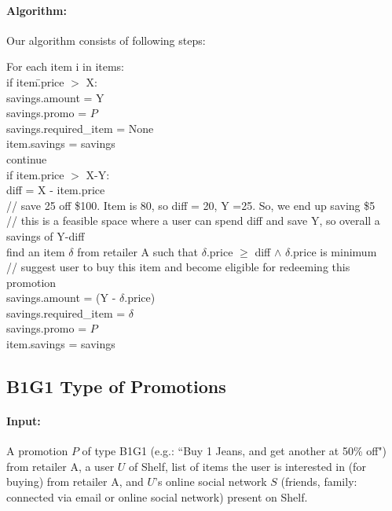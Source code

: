 \documentclass[11pt]{article}
\begin{document}
\paragraph{Algorithm:} Our algorithm consists of following steps:\\
\begin{tabbing}
For each item i in items:\\
if item\=.price $>$ X:\\
\> savings.amount = Y\\
\> savings.promo = $P$\\
\> savings.required\_item = None\\
\> item.savings = savings\\
\> continue\\
if item.price $>$ X-Y:\\
\> diff = X - item.price\\
\> // save 25 off \$100. Item is 80, so diff = 20, Y =25. So, we end up saving \$5\\
\> // this is a feasible space where a user can spend diff and save Y, so overall a savings of Y-diff\\
\>find an item $\delta$ from retailer A such that $\delta$.price $\ge$ diff $\wedge$ $\delta$.price is minimum\\
\> // suggest user to buy this item and become eligible for redeeming this promotion\\
\> savings.amount = (Y - $\delta$.price)\\
\> savings.required\_item = $\delta$\\
\> savings.promo = $P$\\
\> item.savings = savings\\

\end{tabbing}

\subsection{B1G1 Type of Promotions}

\paragraph{Input:}  A promotion $P$ of type B1G1 (e.g.: ``Buy 1 Jeans, and get another at 50\% off") from retailer A, a user $U$ of Shelf, list of items the user is interested in (for buying) from retailer A, and $U$'s online social network $S$ (friends, family: connected via email or online social network) present on Shelf.
\end{document}
